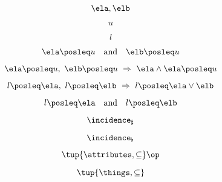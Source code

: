\begin{forslides}
     \begin{equation}
        \label{eq:slides_adjunctions_33}
       \ela, \elb
    \end{equation}
    
     \begin{equation}
        \label{eq:slides_adjunctions_34}
       u
    \end{equation}
    
     \begin{equation}
        \label{eq:slides_adjunctions_35}
      l
    \end{equation}
    
     \begin{equation}
        \label{eq:slides_adjunctions_36}
      \ela \posleq u \quad \text{and} \quad \elb \posleq u
    \end{equation}
    
     \begin{equation}
        \label{eq:slides_adjunctions_37}
     \ela \posleq u, \ \elb \posleq u \ \Rightarrow \ \ela \wedge \ela \posleq u
    \end{equation}
    
     \begin{equation}
        \label{eq:slides_adjunctions_38}
       l \posleq \ela, \ l \posleq \elb  \ \Rightarrow \  l \posleq \ela \vee \elb
    \end{equation}
    
    \begin{equation}
        \label{eq:slides_adjunctions_39}
       l \posleq \ela \quad \text{and} \quad l \posleq \elb
    \end{equation}
    
     \begin{equation}
        \label{eq:slides_adjunctions_40}
       \incidence_\sharp
    \end{equation}
    
     \begin{equation}
        \label{eq:slides_adjunctions_41}
       \incidence_\flat
    \end{equation}
    
     \begin{equation}
        \label{eq:slides_adjunctions_42}
       \tup{\attributes, \subseteq}\op
    \end{equation}
    
     \begin{equation}
        \label{eq:slides_adjunctions_43}
       \tup{\things, \subseteq}
    \end{equation}
    

\end{forslides}
